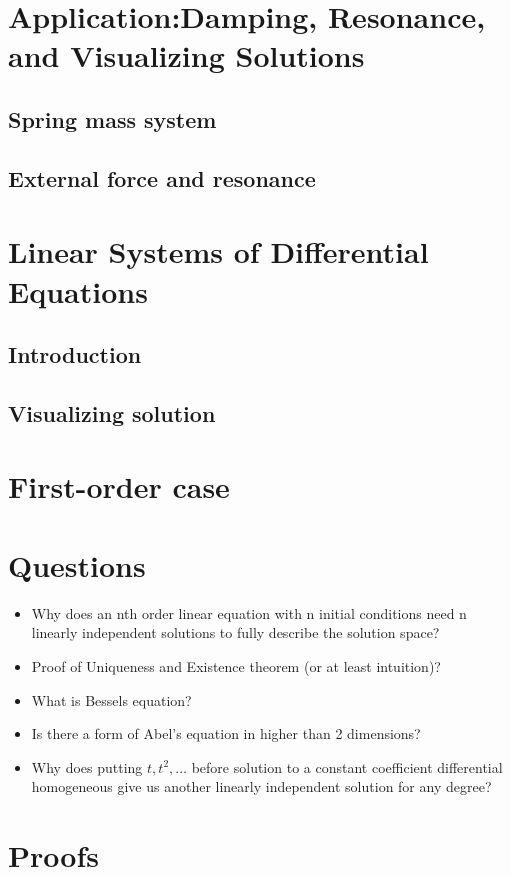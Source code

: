 \documentclass{report}
\begin{document}
\chapter{Application:Damping, Resonance, and Visualizing Solutions}
\section{Spring mass system}
\section{External force and resonance}


\chapter{Linear Systems of Differential Equations}
\section{Introduction}
\section{Visualizing solution}



\chapter{First-order case}

\chapter{Questions}
\begin{itemize}
    \item Why does an nth order linear equation with n initial conditions need n linearly independent solutions to fully describe the solution space?
    \item Proof of Uniqueness and Existence theorem (or at least intuition)?
    \item What is Bessels equation?
    \item Is there a form of Abel's equation in higher than 2 dimensions?
    \item Why does putting $t, t^2, \dots $ before solution to a constant coefficient differential homogeneous give us another linearly independent solution for any degree?
\end{itemize}

\chapter{Proofs}
\end{document}
